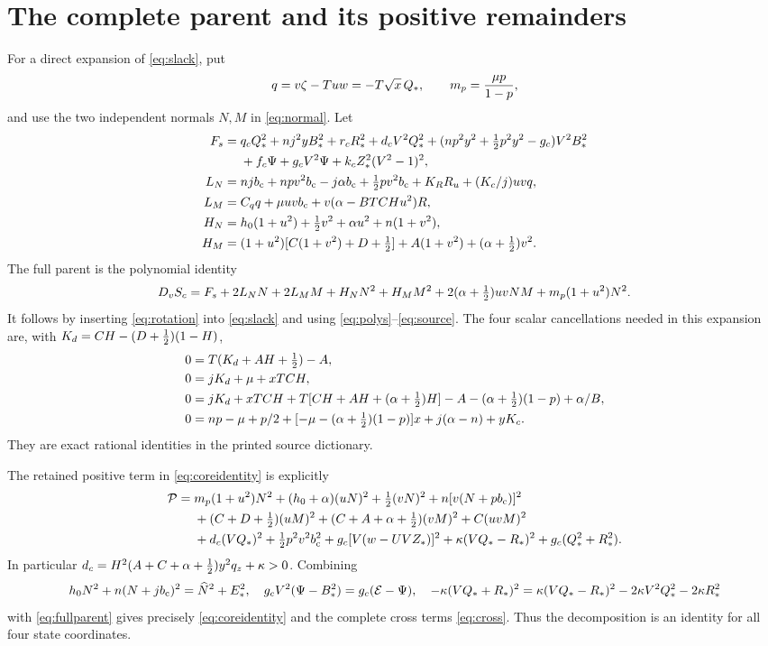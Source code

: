 \section{The complete parent and its positive remainders}\label{app:parent}
For a direct expansion of \eqref{eq:slack}, put
\[
 q=v\zeta-Tuw=-T\sqrt x\,Q_*,\qquad
 m_p=\frac{\mu p}{1-p},
\]
and use the two independent normals $N,M$ in \eqref{eq:normal}.
Let
\begin{align}
 F_s={}&q_cQ_*^2+nj^2yB_*^2+r_cR_*^2+d_cV^2Q_*^2
 +(np^2y^2+\tfrac12 p^2y^2-g_c)V^2B_*^2\notag\\
 &+f_c\Psi+g_cV^2\Psi+k_cZ_*^2(V^2-1)^2,\notag\\
 L_N={}&njb_{\mathrm c}+npv^2b_{\mathrm c}-j\alpha b_{\mathrm c}+\tfrac12 pv^2b_{\mathrm c}
                         +K_RR_u+(K_c/j)uvq,\notag\\
 L_M={}&C_qq+\mu uvb_{\mathrm c}+v(\alpha-BTCHu^2)R,\notag\\
 H_N={}&h_0(1+u^2)+\tfrac12 v^2+\alpha u^2+n(1+v^2),\notag\\
 H_M={}&(1+u^2)[C(1+v^2)+D+\tfrac12]+A(1+v^2)+(\alpha+\tfrac12)v^2 .
 \label{eq:parentcoeff}
\end{align}
The full parent is the polynomial identity
\begin{equation}
 D_vS_c=F_s+2L_NN+2L_MM+H_NN^2+H_MM^2+
              2(\alpha+\tfrac12)uvNM+m_p(1+u^2)N^2 .
 \label{eq:fullparent}
\end{equation}
It follows by inserting \eqref{eq:rotation} into \eqref{eq:slack} and
using \eqref{eq:polys}--\eqref{eq:source}.
The four scalar cancellations needed in this expansion are, with
$K_d=CH-(D+\tfrac12)(1-H)$,
\begin{align*}
 0&=T(K_d+AH+\tfrac12)-A,\\
 0&=jK_d+\mu+xTCH,\\
 0&=jK_d+xTCH+T[CH+AH+(\alpha+\tfrac12)H]
                   -A-(\alpha+\tfrac12)(1-p)+\alpha/B,\\
 0&=np-\mu+p/2+[-\mu-(\alpha+\tfrac12)(1-p)]x+j(\alpha-n)+yK_c .
\end{align*}
They are exact rational identities in the printed source dictionary.

The retained positive term in \eqref{eq:coreidentity} is explicitly
\begin{align}
 \mathcal P={}&m_p(1+u^2)N^2+(h_0+\alpha)(uN)^2
             +\tfrac12(vN)^2+n[v(N+pb_{\mathrm c})]^2\notag\\
 &+(C+D+\tfrac12)(uM)^2+(C+A+\alpha+\tfrac12)(vM)^2+C(uvM)^2\notag\\
 &+d_c(VQ_*)^2+\tfrac12 p^2v^2b_{\mathrm c}^2
            +g_c[V(w-UVZ_*)]^2+\kappa(VQ_*-R_*)^2
            +g_c(Q_*^2+R_*^2).
 \label{eq:retainedall}
\end{align}
In particular $d_c=H^2(A+C+\alpha+\tfrac12)y^2q_z+\kappa>0$.
Combining
\[
 h_0N^2+n(N+jb_{\mathrm c})^2=\widehat N^2+E_*^2,\quad
 g_cV^2(\Psi-B_*^2)=g_c(\mathcal E-\Psi),\quad
 -\kappa(VQ_*+R_*)^2
 =\kappa(VQ_*-R_*)^2-2\kappa V^2Q_*^2-2\kappa R_*^2
\]
with \eqref{eq:fullparent} gives precisely \eqref{eq:coreidentity}
and the complete cross terms \eqref{eq:cross}.
Thus the decomposition is an identity for all four state coordinates.


